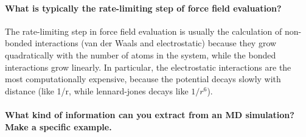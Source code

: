 \paragraph{What is typically the rate-limiting step of force field evaluation?}

The rate-limiting step in force field evaluation is usually the calculation of non-bonded interactions (van der Waals and electrostatic) because they grow quadratically with the number of atoms in the system,
while the bonded interactions grow linearly. In particular, the electrostatic interactions are the most computationally expensive, because the potential decays slowly with distance (like 1/r, while lennard-jones decays like $1/r^6$).

\paragraph{What kind of information can you extract from an MD simulation? Make a specific example.}
